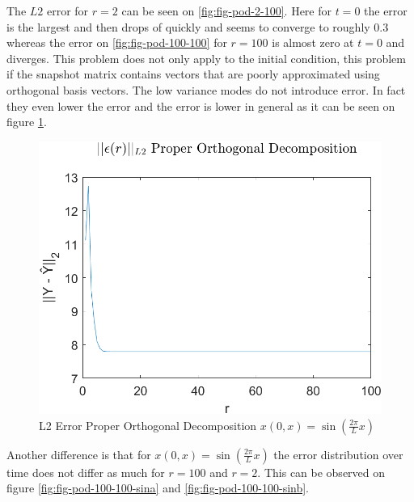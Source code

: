 The \(L2\) error for \(r=2\) can be seen on \ref{fig:fig-pod-2-100}.
Here for \(t=0\) the error is the largest and then drops of quickly and seems to converge to roughly 0.3 whereas the error on \ref{fig:fig-pod-100-100} for \(r=100\) is almost zero at \(t=0\) and diverges.
This problem does not only apply to the initial condition, this problem if the snapshot matrix contains vectors that are poorly approximated using orthogonal basis vectors.
The low variance modes do not introduce error. 
In fact they even lower the error and the error is lower in general as it can be seen on figure \ref{FIG-ERR-POD-SIN}.
\begin{figure}[H]
\centering
\includegraphics[width=12.5cm]{images/L2_POD_SIN}
\caption{L2 Error Proper Orthogonal Decomposition $x(0, x) = \sin(\frac{2\pi}{L}x)$}
\label{FIG-ERR-POD-SIN}
\end{figure}
Another difference is that for $x(0, x) = \sin(\frac{2\pi}{L}x)$ the error distribution over time does not differ as much for \(r=100\) and \(r=2\).
This can be observed on figure \ref{fig:fig-pod-100-100-sina} and \ref{fig:fig-pod-100-100-sinb}.
